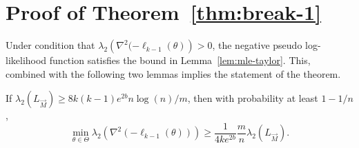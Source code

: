 \section{Proof of Theorem~\ref{thm:break-1}} \label{sec:proof-break-1}

Under condition that $\lambda_2\left(\nabla^2 (-\ell_{k-1}(\theta) \right)>0$, the negative pseudo log-likelihood function satisfies the bound in Lemma~\ref{lem:mle-taylor}. This, combined with the following two lemmas implies the statement of the theorem.


\begin{lemma} If $\lambda_2(L_{\vec{M}}) \geq 8 k(k-1)e^{2b} n\log(n)/m$, then with probability at least $1-1/n$,
$$
\min_{\theta \in \Theta}\lambda_2(\nabla^2(-\ell_{k-1}(\theta))) \geq \frac{1}{4ke^{2b}} \frac{m}{n}\lambda_2(L_{\vec{M}}). 
$$
\label{lem:break1lambda_2}
\end{lemma}

